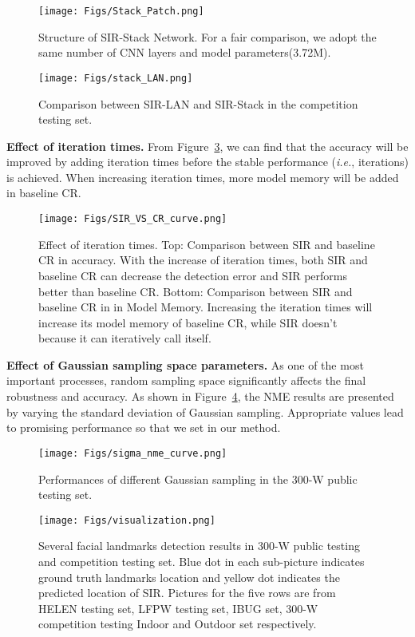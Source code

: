 \documentclass[letterpaper]{article} \usepackage{aaai18}  \usepackage{times}  \usepackage{helvet}  \usepackage{courier}  \usepackage{url}  \usepackage{graphicx}
\def\ie{{\em i.e.}}
\begin{document}
\begin{figure}[H]
\centering
\texttt{[image: Figs/Stack\_Patch.png]}
\caption{Structure of SIR-Stack Network. For a fair comparison, we adopt the same number of CNN layers and model parameters(3.72M).}
\label{fig:stack_patch}
\end{figure}

\begin{figure}[h]
\centering
\texttt{[image: Figs/stack\_LAN.png]}
\caption{Comparison between SIR-LAN and SIR-Stack in the competition testing set.}
\label{fig:network_curve}
\end{figure}

{\noindent \textbf{Effect of iteration times.}} From Figure~\ref{fig:iteration_curve}, we can find that the accuracy will be improved by adding iteration times before the stable performance (\ie,  iterations) is achieved. When increasing iteration times, more model memory will be added in baseline CR.
\begin{figure}[H]
\centering
\texttt{[image: Figs/SIR\_VS\_CR\_curve.png]}
\caption{Effect of iteration times. Top: Comparison between SIR and baseline CR in accuracy. With the increase of iteration times, both SIR and baseline CR can decrease the detection error and SIR performs better than baseline CR. Bottom: Comparison between SIR and baseline CR in in Model Memory. Increasing the iteration times will increase its model memory of baseline CR, while SIR doesn't because it can iteratively call itself.}
\label{fig:iteration_curve}
\end{figure}

{\noindent \textbf{Effect of Gaussian sampling space parameters.}} As one of the most important processes, random sampling space significantly affects the final robustness and accuracy. As shown in Figure~\ref{fig:sigma_nme_curve}, the NME results are presented by varying the standard deviation  of Gaussian sampling. Appropriate values lead to promising performance so that we set  in our method.
\begin{figure}[H]
\centering
\texttt{[image: Figs/sigma\_nme\_curve.png]}
\caption{Performances of different Gaussian sampling in the 300-W public testing set.}
\label{fig:sigma_nme_curve}
\end{figure}

\begin{figure}[h]
\centering
\texttt{[image: Figs/visualization.png]}
\caption{Several facial landmarks detection results in 300-W public testing and competition testing set. Blue dot in each sub-picture indicates ground truth landmarks location and yellow dot indicates the predicted location of SIR. Pictures for the five rows are from HELEN testing set, LFPW testing set, IBUG set, 300-W competition testing Indoor and Outdoor set respectively.}
\label{fig:visualization}
\end{figure}
\end{document}
